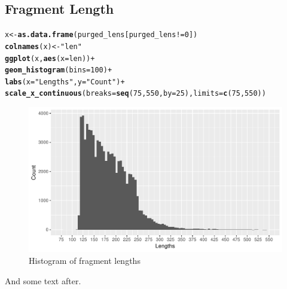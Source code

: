 \documentclass[12pt, a4paper]{article}\usepackage[]{graphicx}\usepackage[]{color}
\makeatletter
\def\maxwidth{ %
  \ifdim\Gin@nat@width>\linewidth
    \linewidth
  \else
    \Gin@nat@width
  \fi
}
\newcommand{\hlnum}[1]{\textcolor[rgb]{0.686,0.059,0.569}{#1}}%
\newcommand{\hlstr}[1]{\textcolor[rgb]{0.192,0.494,0.8}{#1}}%
\newcommand{\hlopt}[1]{\textcolor[rgb]{0,0,0}{#1}}%
\newcommand{\hlstd}[1]{\textcolor[rgb]{0.345,0.345,0.345}{#1}}%
\newcommand{\hlkwb}[1]{\textcolor[rgb]{0.69,0.353,0.396}{#1}}%
\newcommand{\hlkwc}[1]{\textcolor[rgb]{0.333,0.667,0.333}{#1}}%
\newcommand{\hlkwd}[1]{\textcolor[rgb]{0.737,0.353,0.396}{\textbf{#1}}}%
\newenvironment{kframe}{%
 \def\at@end@of@kframe{}%
 \ifinner\ifhmode%
  \def\at@end@of@kframe{\end{minipage}}%
  \begin{minipage}{\columnwidth}%
 \fi\fi%
 \def\FrameCommand##1{\hskip\@totalleftmargin \hskip-\fboxsep
 \colorbox{shadecolor}{##1}\hskip-\fboxsep
     \hskip-\linewidth \hskip-\@totalleftmargin \hskip\columnwidth}%
 \MakeFramed {\advance\hsize-\width
   \@totalleftmargin\z@ \linewidth\hsize
   \@setminipage}}%
 {\par\unskip\endMakeFramed%
 \at@end@of@kframe}
\newenvironment{knitrout}{}{} %
\makeatother
\begin{document}
\subsection{Fragment Length}
\begin{knitrout}
\color{fgcolor}\begin{kframe}
\begin{alltt}
\hlstd{x} \hlkwb{<-} \hlkwd{as.data.frame}\hlstd{(purged_lens[purged_lens} \hlopt{!=} \hlnum{0}\hlstd{])}
\hlkwd{colnames}\hlstd{(x)} \hlkwb{<-} \hlstr{"len"}
\hlkwd{ggplot}\hlstd{(x,} \hlkwd{aes}\hlstd{(}\hlkwc{x} \hlstd{= len))} \hlopt{+}
        \hlkwd{geom_histogram}\hlstd{(}\hlkwc{bins} \hlstd{=} \hlnum{100}\hlstd{)} \hlopt{+}
        \hlkwd{labs}\hlstd{(}\hlkwc{x} \hlstd{=} \hlstr{"Lengths"}\hlstd{,} \hlkwc{y} \hlstd{=} \hlstr{"Count"}\hlstd{)} \hlopt{+}
        \hlkwd{scale_x_continuous}\hlstd{(}\hlkwc{breaks} \hlstd{=} \hlkwd{seq}\hlstd{(}\hlnum{75}\hlstd{,} \hlnum{550}\hlstd{,} \hlkwc{by} \hlstd{=} \hlnum{25}\hlstd{),} \hlkwc{limits} \hlstd{=} \hlkwd{c}\hlstd{(}\hlnum{75}\hlstd{,}\hlnum{550}\hlstd{))}
\end{alltt}


{\ttfamily\noindent\color{warningcolor}{\#\# Warning: Removed 38 rows containing non-finite values (stat\_bin).}}

{\ttfamily\noindent\color{warningcolor}{\#\# Warning: Removed 1 rows containing missing values (geom\_bar).}}\end{kframe}\begin{figure}[h]
\includegraphics[width=\maxwidth]{figure/p2-1} \caption[Histogram of fragment lengths]{Histogram of fragment lengths}\label{fig:p2}
\end{figure}


\end{knitrout}

And some text after.
\end{document}
